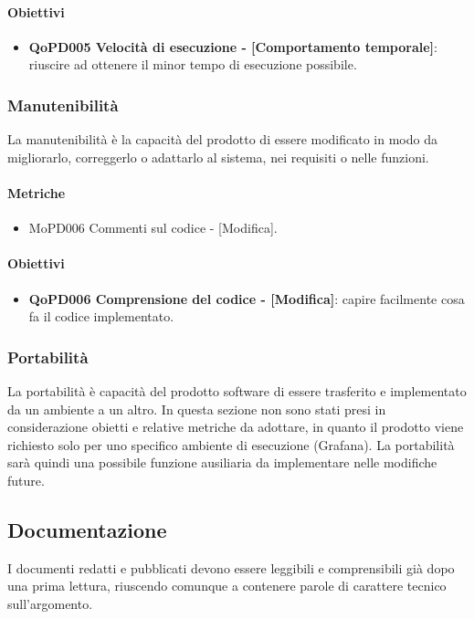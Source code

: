 \documentclass[../piano-di-qualifica.tex]{subfiles}
\begin{document}
\paragraph{Obiettivi}
\label{sub:obiettivi}
\begin{itemize}
    \item \textbf{QoPD005 Velocità di esecuzione - [Comportamento temporale]}: riuscire ad ottenere il minor tempo di esecuzione possibile.
\end{itemize}

\subsubsection{Manutenibilità}%
\label{sub:manutenibilita}
La manutenibilità è la capacità del prodotto di essere modificato in modo da migliorarlo, correggerlo o adattarlo al sistema, nei requisiti o nelle funzioni.

\paragraph{Metriche}
\label{sub:metriche}
\begin{itemize}
    \item MoPD006 Commenti sul codice - [Modifica].
\end{itemize}

\paragraph{Obiettivi}
\label{sub:obiettivi}
\begin{itemize}
    \item \textbf{QoPD006 Comprensione del codice - [Modifica]}: capire facilmente cosa fa il codice implementato.
\end{itemize}


\subsubsection{Portabilità}%
\label{sub:portabilita}
La portabilità è capacità del prodotto software di essere trasferito e implementato da un ambiente a un altro.
In questa sezione non sono stati presi in considerazione obietti e relative metriche da adottare, in quanto il prodotto viene richiesto solo per uno specifico ambiente di esecuzione (Grafana).
La portabilità sarà quindi una possibile funzione ausiliaria da implementare nelle modifiche future.

\subsection{Documentazione}%
\label{sub:documentazione}
I documenti redatti e pubblicati devono essere leggibili e comprensibili già dopo una prima lettura, riuscendo comunque a contenere parole di carattere tecnico sull'argomento.
\end{document}
